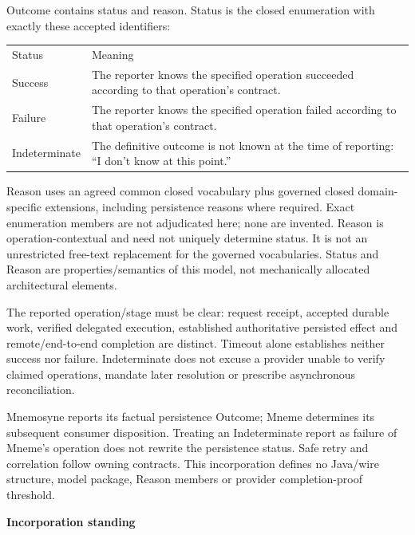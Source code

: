 Outcome contains status and reason. Status is the closed enumeration with exactly these accepted identifiers:



\begin{longtable}{>{\raggedright\arraybackslash}p{}>{\raggedright\arraybackslash}p{}}
Status & Meaning \\
Success & The reporter knows the specified operation succeeded according to that operation's contract. \\
Failure & The reporter knows the specified operation failed according to that operation's contract. \\
Indeterminate & The definitive outcome is not known at the time of reporting: “I don't know at this point.” \\
\end{longtable}


Reason uses an agreed common closed vocabulary plus governed closed domain-specific extensions, including persistence reasons where required. Exact enumeration members are not adjudicated here; none are invented. Reason is operation-contextual and need not uniquely determine status. It is not an unrestricted free-text replacement for the governed vocabularies. Status and Reason are properties/semantics of this model, not mechanically allocated architectural elements.



The reported operation/stage must be clear: request receipt, accepted durable work, verified delegated execution, established authoritative persisted effect and remote/end-to-end completion are distinct. Timeout alone establishes neither success nor failure. Indeterminate does not excuse a provider unable to verify claimed operations, mandate later resolution or prescribe asynchronous reconciliation.



Mnemosyne reports its factual persistence Outcome; Mneme determines its subsequent consumer disposition. Treating an Indeterminate report as failure of Mneme's operation does not rewrite the persistence status. Safe retry and correlation follow owning contracts. This incorporation defines no Java/wire structure, model package, Reason members or provider completion-proof threshold.



\par\medskip\textbf{Incorporation standing}\par


